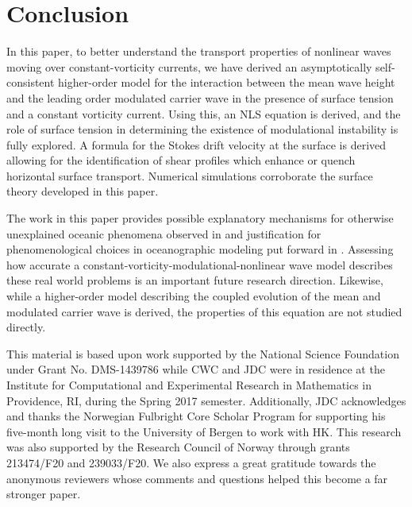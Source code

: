 \documentclass{JFM_Style/jfm}
\begin{document}
\section{Conclusion}

In this paper, to better understand the transport properties of nonlinear waves moving over constant-vorticity currents, we have derived an asymptotically self-consistent higher-order model for the interaction between the mean wave height and the leading order modulated carrier wave in the presence of surface tension and a constant vorticity current.  Using this, an NLS equation is derived, and the role of surface tension in determining the existence of modulational instability is fully explored.  A formula for the Stokes drift velocity at the surface is derived allowing for the identification of shear profiles which enhance or quench horizontal surface transport.  Numerical simulations corroborate the surface theory developed in this paper.

The work in this paper provides possible explanatory mechanisms for otherwise unexplained oceanic phenomena observed
in \cite{smith} and justification for phenomenological choices in oceanographic modeling put forward in \cite{breivik}.  Assessing how accurate a constant-vorticity-modulational-nonlinear wave model describes these real world problems is an important future research direction.  Likewise, while a higher-order model describing the coupled evolution of the mean and modulated carrier wave is derived, the properties of this equation are not studied directly.
   
\bigskip

This material is based upon work supported by the National Science Foundation under Grant No. DMS-1439786 while CWC and JDC were in residence at the Institute for Computational and Experimental Research in Mathematics in Providence, RI, during the Spring 2017 semester.  Additionally, JDC acknowledges and thanks the Norwegian Fulbright Core Scholar Program for supporting his five-month long visit to the University of Bergen to work with HK. This research was also supported by
the Research Council of Norway through grants 213474/F20 and 239033/F20.  We also express a great gratitude towards the anonymous reviewers whose comments and questions helped this become a far stronger paper.



\end{document}
